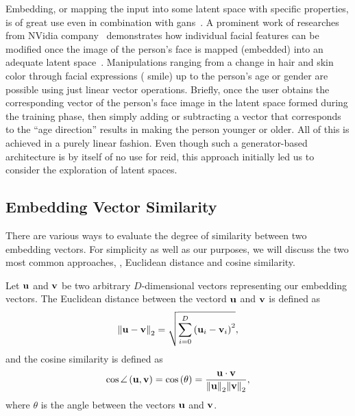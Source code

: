 Embedding, or mapping the input into some latent space with specific properties, is of great use even in combination with \glspl{gan}~\cite{goodfellow2014gans}. A prominent work of researches from NVidia company~\cite{webnvidia} demonstrates how individual facial features can be modified once the image of the person's face is mapped (embedded) into an adequate latent space~\cite{karras2020stylegan}. Manipulations ranging from a change in hair and skin color through facial expressions (\egtext{} smile) up to the person's age or gender are possible using just linear vector operations. Briefly, once the user obtains the corresponding vector of the person's face image in the latent space formed during the training phase, then simply adding or subtracting a vector that corresponds to the ``age direction'' results in making the person younger or older. All of this is achieved in a purely linear fashion. Even though such a generator-based architecture is by itself of no use for \gls{reid}, this approach initially led us to consider the exploration of latent spaces.

\subsection{Embedding Vector Similarity}
\label{ssec:EmbeddingVectorSimilarity}

There are various ways to evaluate the degree of similarity between two embedding vectors. For simplicity as well as our purposes, we will discuss the two most common approaches, \ietext{}, Euclidean distance and cosine similarity.

Let $\mathbf{u}$ and $\mathbf{v}$ be two arbitrary $D$-dimensional vectors representing our embedding vectors. The Euclidean distance between the vectord $\mathbf{u}$ and $\mathbf{v}$ is defined as
\begin{equation}
    \label{eq:EuclideanDistance}
    {\left\Vert {\mathbf{u} - \mathbf{v}} \right\Vert}_2 =
    \sqrt{
        \sum_{i = 0}^{D} \left( {\mathbf{u}_i - \mathbf{v}_i} \right)^2
    },
\end{equation}
and the cosine similarity is defined as
\begin{equation}
    \label{eq:CosineSimilarity}
    {\cos \angle} \left( \mathbf{u}, \mathbf{v} \right) =
    {\cos} \left( \theta \right) =
    \frac{
        \mathbf{u} \cdot \mathbf{v}
    }{
        {\left\Vert {\mathbf{u}} \right\Vert}_2 {\left\Vert {\mathbf{v}} \right\Vert}_2
    },
\end{equation}
where $\theta$ is the angle between the vectors $\mathbf{u}$ and $\mathbf{v}$.

